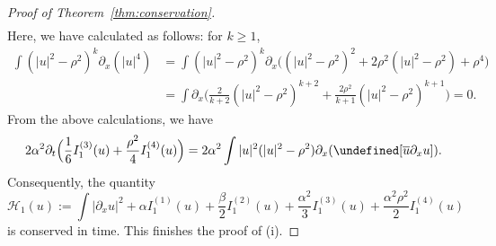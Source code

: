 \documentclass{amsart}
\numberwithin{equation}{section}
\let\Im=\undefined\DeclareMathOperator{\Im}{Im}
\begin{document}
\begin{proof}[Proof of Theorem~\ref{thm:conservation}]
\begin{align*}
\end{align*}
Here, we have calculated as follows: for $k\geq 1$, 
\begin{align*}
\int (|u|^2-\rho^2)^k\partial_x(|u|^4) 
&=\int (|u|^2-\rho^2)^k\partial_x\Big( (|u|^2-\rho^2)^2 +2\rho^2(|u|^2-\rho^2)+\rho^4 \Big) \\
&=\int \partial_x\Big( \frac{2}{k+2}(|u|^2-\rho^2)^{k+2}+\frac{2\rho^2}{k+1}(|u|^2-\rho^2)^{k+1}\Big) =0.
\end{align*}
From the above calculations, we have
\[ 2\alpha ^2\partial_t\Big( \frac16I_1^{(3)}(u)+\frac{\rho^2}4I_1^{(4)}(u)\Big) =2\alpha ^2\int |u|^2(|u|^2-\rho^2)\partial_x(\Im[\overline{u}\partial_xu]).\]
Consequently, the quantity
\[ \mathcal{H}_1(u):=\int |\partial_xu|^2 +\alpha I_1^{(1)}(u)+\frac{\beta}{2}I_1^{(2)}(u)+\frac{\alpha^2}{3}I_1^{(3)}(u)+\frac{\alpha^2\rho^2}{2}I_1^{(4)}(u) \]
is conserved in time.
This finishes the proof of (i).


\end{proof}
\end{document}

